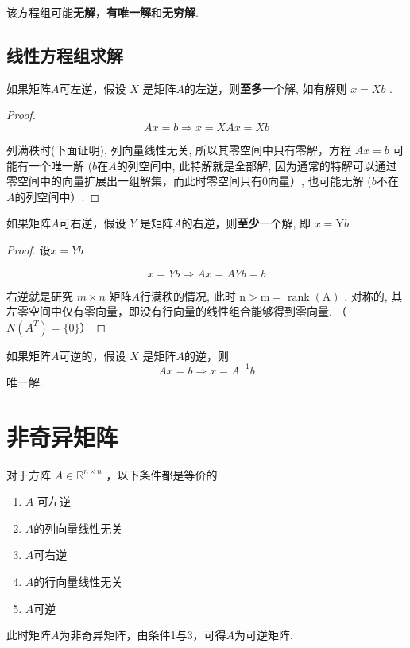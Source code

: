 该方程组可能\textbf{无解}，\textbf{有唯一解}和\textbf{无穷解}.

\subsection{线性方程组求解}

\begin{theorem}
    如果矩阵$A$可左逆，假设 $ X $ 是矩阵$A$的左逆，则\textbf{至多}一个解, 如有解则 $ x=X b $ . 
\end{theorem}

\begin{proof}
    $$
A x=b \Rightarrow  x=X A x=X b
$$

    列满秩时(下面证明), 列向量线性无关, 所以其零空间中只有零解，方程 $ {Ax}={b} $ 可能有一个唯一解 ($b$在$A$的列空间中, 此特解就是全部解, 因为通常的特解可以通过零空间中的向量扩展出一组解集，而此时零空间只有$0$向量）, 也可能无解 ($b$不在$A$的列空间中）. 
\end{proof}

\begin{theorem}
    如果矩阵$A$可右逆，假设 $ Y $ 是矩阵$A$的右逆，则\textbf{至少}一个解, 即 $ x=\mathrm{Y} b $ . 
\end{theorem}

\begin{proof}
    设$x=Y b$ 

    $$
x=Y b  \Rightarrow  A x=A Y b=b
$$


右逆就是研究 $m \times n $ 矩阵$A$行满秩的情况, 此时 $ \mathrm{n}>\mathrm{m}=\operatorname{rank}(\mathrm{A}) $ . 对称的, 其左零空间中仅有零向量，即没有行向量的线性组合能够得到零向量. （$N(A ^T ) = \{0\}$）
\end{proof}

\begin{theorem}
    如果矩阵$A$可逆的，假设 $ X $ 是矩阵$A$的逆，则
$$
A x=b  \Rightarrow  x=A^{-1} b
$$
唯一解. 
\end{theorem}

\begin{corollary}
    
\end{corollary}


\section{非奇异矩阵}

\begin{theorem}
    对于方阵 $ A \in \mathbb{R}^{n \times n} $ ，以下条件都是等价的:

    \begin{enumerate}
        \item $ A $ 可左逆
        \item $A$的列向量线性无关
        \item $A$可右逆
        \item $A$的行向量线性无关
        \item $A$可逆
    \end{enumerate}

    此时矩阵$A$为非奇异矩阵，由条件1与3，可得$A$为可逆矩阵. 
\end{theorem}

